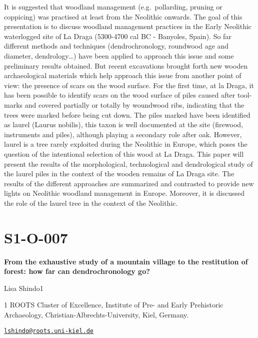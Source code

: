 \documentclass[
]{book}
\begin{document}
It is suggested that woodland management (e.g.~pollarding, pruning or
coppicing) was practised at least from the Neolithic onwards. The goal
of this presentation is to discuss woodland management practices in the
Early Neolithic waterlogged site of La Draga (5300-4700 cal BC -
Banyoles, Spain). So far different methods and techniques
(dendrochronology, roundwood age and diameter, dendrology\ldots) have been
applied to approach this issue and some preliminary results obtained.
But recent excavations brought forth new wooden archaeological materials
which help approach this issue from another point of view: the presence
of scars on the wood surface. For the first time, at la Draga, it has
been possible to identify scars on the wood surface of piles caused
after tool-marks and covered partially or totally by woundwood ribs,
indicating that the trees were marked before being cut down. The piles
marked have been identified as laurel (Laurus nobilis), this taxon is
well documented at the site (firewood, instruments and piles), although
playing a secondary role after oak. However, laurel is a tree rarely
exploited during the Neolithic in Europe, which poses the question of
the intentional selection of this wood at La Draga. This paper will
present the results of the morphological, technological and
dendrological study of the laurel piles in the context of the wooden
remains of La Draga site. The results of the different approaches are
summarized and contrasted to provide new lights on Neolithic woodland
management in Europe. Moreover, it is discussed the role of the laurel
tree in the context of the Neolithic.

\hypertarget{s1-o-007}{%
\section*{S1-O-007}\label{s1-o-007}}

\textbf{From the exhaustive study of a mountain village to the restitution of
forest: how far can dendrochronology go?}

Lisa Shindo1

1 ROOTS Cluster of Excellence, Institute of Pre- and Early Prehistoric
Archaeology, Christian-Albrechts-University, Kiel, Germany.

\href{mailto:lshindo@roots.uni-kiel.de}{\nolinkurl{lshindo@roots.uni-kiel.de}}
\end{document}
